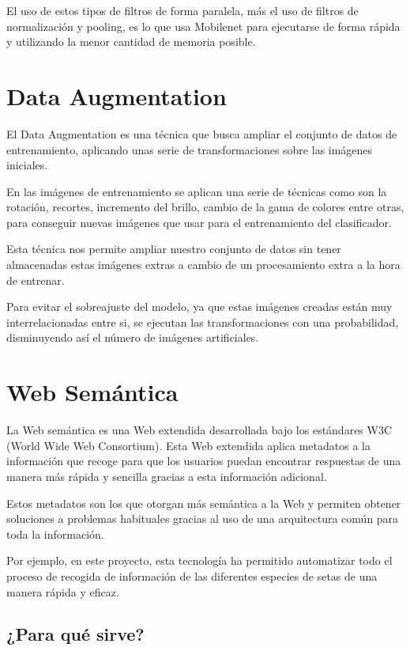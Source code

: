 El uso de estos tipos de filtros de forma paralela, más el uso de filtros de normalización y pooling, es lo que usa Mobilenet para ejecutarse de forma rápida y utilizando la menor cantidad de memoria posible.

\section{Data Augmentation}

	El Data Augmentation es una técnica que busca ampliar el conjunto de datos de entrenamiento, aplicando unas serie de transformaciones sobre las imágenes iniciales. \cite{NIPS2012_4824}
	
En las imágenes de entrenamiento se aplican una serie de técnicas como son la rotación, recortes, incremento del brillo, cambio de la gama de colores  entre otras, para conseguir nuevas imágenes que usar para el entrenamiento del clasificador.

Esta técnica nos permite ampliar nuestro conjunto de datos sin tener almacenadas estas imágenes extras a cambio de un procesamiento extra a la hora de entrenar.

Para evitar el sobreajuste del modelo, ya que estas imágenes creadas están muy interrelacionadas entre si, se ejecutan las transformaciones con una probabilidad, disminuyendo así el número de imágenes artificiales.


\section{Web Semántica}

La Web semántica es una Web extendida desarrollada bajo los estándares W3C (World Wide Web Consortium). Esta Web extendida aplica metadatos a la información que recoge para que los usuarios puedan encontrar respuestas de una manera más rápida y sencilla gracias a esta información adicional.\cite{webSemantica} 

Estos metadatos son los que otorgan más semántica a la Web y permiten obtener soluciones a problemas habituales gracias al uso de una arquitectura común para toda la información. 

Por ejemplo, en este proyecto, esta tecnología ha permitido automatizar todo el proceso de recogida de información de las diferentes especies de setas de una manera rápida y eficaz.

\subsection{¿Para qué sirve?}

